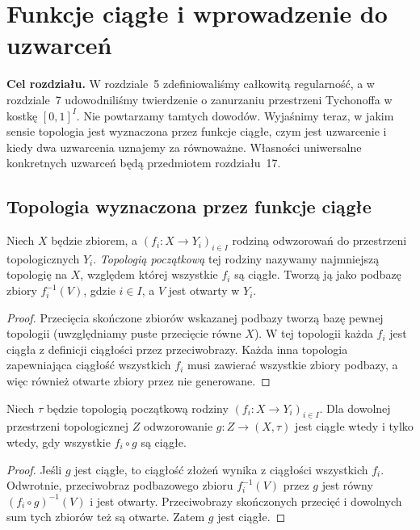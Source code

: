 \chapter{Funkcje ciągłe i wprowadzenie do uzwarceń}
\label{ch:topog-funkcje-uzwarcenia}

\noindent\textbf{Cel rozdziału.}
W rozdziale~5 zdefiniowaliśmy całkowitą regularność,
a w rozdziale~7 udowodniliśmy twierdzenie o zanurzaniu
przestrzeni Tychonoffa w kostkę $[0,1]^I$.
Nie powtarzamy tamtych dowodów. Wyjaśnimy teraz,
w jakim sensie topologia jest wyznaczona przez funkcje
ciągłe, czym jest uzwarcenie i kiedy dwa uzwarcenia
uznajemy za równoważne. Własności uniwersalne
konkretnych uzwarceń będą przedmiotem rozdziału~17.

\section{Topologia wyznaczona przez funkcje ciągłe}
\label{sec:topog-uzwarcenia-funkcje}

\begin{definicja}
\label{def:topog-uzwarcenia-topologia-poczatkowa}
Niech $X$ będzie zbiorem, a
$(f_i\colon X\to Y_i)_{i\in I}$ rodziną
odwzorowań do przestrzeni topologicznych $Y_i$.
\emph{Topologią początkową} tej rodziny
nazywamy najmniejszą topologię na $X$,
względem której wszystkie $f_i$ są ciągłe.
Tworzą ją jako podbazę zbiory
$f_i^{-1}(V)$, gdzie $i\in I$,
a $V$ jest otwarty w $Y_i$.
\end{definicja}
\begin{proof}
Przecięcia skończone zbiorów wskazanej
podbazy tworzą bazę pewnej topologii
(uwzględniamy puste przecięcie równe $X$).
W tej topologii każda $f_i$ jest ciągła
z definicji ciągłości przez przeciwobrazy.
Każda inna topologia zapewniająca
ciągłość wszystkich $f_i$ musi zawierać
wszystkie zbiory podbazy, a więc również
otwarte zbiory przez nie generowane.
\end{proof}

\begin{stwierdzenie}
\label{prop:topog-uzwarcenia-poczatkowa-ciaglosc}
Niech $\tau$ będzie topologią początkową
rodziny $(f_i\colon X\to Y_i)_{i\in I}$.
Dla dowolnej przestrzeni topologicznej $Z$
odwzorowanie $g\colon Z\to(X,\tau)$
jest ciągłe wtedy i tylko wtedy,
gdy wszystkie $f_i\circ g$ są ciągłe.
\end{stwierdzenie}
\begin{proof}
Jeśli $g$ jest ciągłe, to ciągłość złożeń
wynika z ciągłości wszystkich $f_i$.
Odwrotnie, przeciwobraz podbazowego zbioru
$f_i^{-1}(V)$ przez $g$ jest równy
$(f_i\circ g)^{-1}(V)$ i jest otwarty.
Przeciwobrazy skończonych przecięć
i dowolnych sum tych zbiorów też są otwarte.
Zatem $g$ jest ciągłe.
\end{proof}

